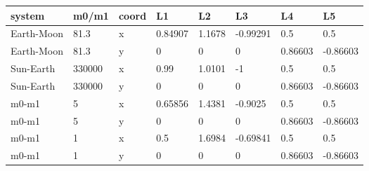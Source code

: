 \begin{tabular}{llllllll}
system & m0/m1 & coord & L1 & L2 & L3 & L4 & L5 \\ 
\hline 
Earth-Moon & 81.3 & x & 0.84907 & 1.1678 & -0.99291 & 0.5 & 0.5 \\ 
Earth-Moon & 81.3 & y & 0 & 0 & 0 & 0.86603 & -0.86603 \\ 
Sun-Earth & 330000 & x & 0.99 & 1.0101 & -1 & 0.5 & 0.5 \\ 
Sun-Earth & 330000 & y & 0 & 0 & 0 & 0.86603 & -0.86603 \\ 
m0-m1 & 5 & x & 0.65856 & 1.4381 & -0.9025 & 0.5 & 0.5 \\ 
m0-m1 & 5 & y & 0 & 0 & 0 & 0.86603 & -0.86603 \\ 
m0-m1 & 1 & x & 0.5 & 1.6984 & -0.69841 & 0.5 & 0.5 \\ 
m0-m1 & 1 & y & 0 & 0 & 0 & 0.86603 & -0.86603 \\ 
\hline 
\end{tabular}